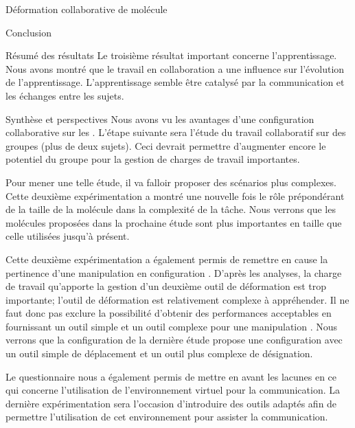 \documentclass[myfrancais,ngerman,english,french]{mythesis}
\begin{document}
\begin{mychapter}{Déformation collaborative de molécule}
\begin{mysection}{Conclusion}
\begin{mysubsection}{Résumé des résultats}
				Le troisième résultat important concerne l'apprentissage.
				Nous avons montré que le travail en collaboration a une influence sur l'évolution de l'apprentissage.
				L'apprentissage semble être catalysé par la communication et les échanges entre les sujets.
			\end{mysubsection}
			\begin{mysubsection}{Synthèse et perspectives}
				Nous avons vu les avantages d'une configuration collaborative sur les .
				L'étape suivante sera l'étude du travail collaboratif sur des groupes (plus de deux sujets).
				Ceci devrait permettre d'augmenter encore le potentiel du groupe pour la gestion de charges de travail importantes.

				Pour mener une telle étude, il va falloir proposer des scénarios plus complexes.
				Cette deuxième expérimentation a montré une nouvelle fois le rôle prépondérant de la taille de la molécule dans la complexité de la tâche.
				Nous verrons que les molécules proposées dans la prochaine étude sont plus importantes en taille que celle utilisées jusqu'à présent.

				Cette deuxième expérimentation a également permis de remettre en cause la pertinence d'une manipulation en configuration .
				D'après les analyses, la charge de travail qu'apporte la gestion d'un deuxième outil de déformation est trop importante; l'outil de déformation est relativement complexe à appréhender.
				Il ne faut donc pas exclure la possibilité d'obtenir des performances acceptables en fournissant un outil simple et un outil complexe pour une manipulation .
				Nous verrons que la configuration de la dernière étude  propose une configuration  avec un outil simple de déplacement et un outil plus complexe de désignation.

				Le questionnaire nous a également permis de mettre en avant les lacunes en ce qui concerne l'utilisation de l'environnement virtuel pour la communication.
				La dernière expérimentation sera l'occasion d'introduire des outils adaptés afin de permettre l'utilisation de cet environnement pour assister la communication.
			\end{mysubsection}
		\end{mysection}
	\end{mychapter}
\end{document}
